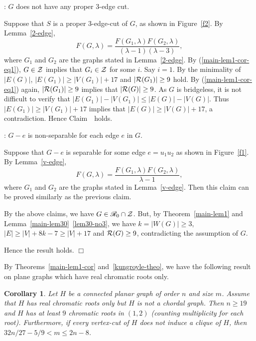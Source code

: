 \documentclass[11pt]{article}
\newtheorem{cor}{Corollary}
\newcommand {\red} {\textcolor{red}}
\newcommand{\proofend}{{\hfill$\Box$}}
\newcounter{countclaim}
\def\inclaim{\addtocounter{countclaim}{1}
{\noindent {\bf Claim \thecountclaim}: }}
\def\setz{{\cal Z}}
\def \setr{{\cal R}}
\def \setgr {\mathscr{R}}
\newcommand{\beeq}{\begin{equation}}
\newcommand{\eneq}{\end{equation}}
\newcommand {\relabel}[1] {\label{#1} \red{[*: #1]}}\newcommand {\rebibitem}[1] {\bibitem{#1} \red{[*: #1]}}%
\def\relabel {\label} \def\rebibitem {\bibitem}  %
\begin{document}
\inclaim $G$ does not have any proper $3$-edge cut.

Suppose that $S$ is  a proper 
$3$-edge-cut of $G$, as shown in Figure~\ref{f2}. 
By Lemma~\ref{2-edge},
\beeq\relabel{main-lem1-cor-eq1}
F(G,\lambda)=\frac{F(G_1,\lambda)F(G_2,\lambda)}
{(\lambda -1)(\lambda-3)},
\eneq
where $G_1$ and $G_2$ are the 
graphs stated in  Lemma~\ref{2-edge}.
By (\ref{main-lem1-cor-eq1}), 
$G\in \setz$ implies that $G_i\in \setz$ for some $i$.
Say $i=1$. 
By the minimality of $|E(G)|$, 
$|E(G_1)|\ge |V(G_1)|+17$ and $|\setr(G_1)|\ge 9$ hold.
By (\ref{main-lem1-cor-eq1}) again, 
$|\setr(G_1)|\ge 9$ implies that $|\setr(G)|\ge 9$. 
As $G$ is bridgeless,  
it is not difficult to verify that 
$|E(G_1)|-|V(G_1)|\le |E(G)|-|V(G)|$.
Thus $|E(G_1)|\ge |V(G_1)|+17$  implies that 
$|E(G)|\ge |V(G)|+17$, a contradiction. 
Hence Claim~\thecountclaim\ holds. 

\inclaim $G-e$ is non-separable for each edge $e$ in $G$.

Suppose that $G-e$ is separable 
for some edge $e=u_1u_2$ as shown in Figure~\ref{f1}.  
By Lemma~\ref{v-edge}, 
\beeq\relabel{main-lem1-cor-eq2}
F(G,\lambda)=\frac{F(G_1,\lambda)F(G_2,\lambda)}
{\lambda -1},
\eneq
where $G_1$ and $G_2$ are the 
graphs stated in  Lemma~\ref{v-edge}. 
Then this claim can be proved similarly 
as the previous claim. 

By the above claims, we have $G\in \setgr_0\cap \setz$.
But, by Theorem~\ref{main-lem1} 
and Lemma~\ref{main-lem30}~\ref{lem30-no3}, we have
$k=|W(G)|\ge 3$,
$|E|\ge |V|+8k-7\ge |V|+17$
and $\setr(G)\ge 9$, contradicting the assumption of $G$. 

Hence the result holds.
\proofend

By Theorems~\ref{main-lem1-cor} and~\ref{kungroyle-theo},
we have the following result on plane graphs 
which have real chromatic roots only. 


\begin{cor}
\relabel{cor3-th1}
Let $H$ be a 
connected planar graph of order $n$ and size $m$.
Assume that $H$ has real chromatic roots only 
but $H$ is not a chordal graph.
Then $n\ge 19$ and $H$ has at least $9$ chromatic roots in $(1,2)$
(counting multiplicity for each root). 
Furthermore, if every vertex-cut of $H$ 
does not induce a clique of $H$, 
then  $32n/27-5/9< m\le 2n-8$.
\end{cor}
\end{document}
